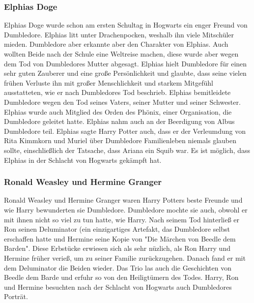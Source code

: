 \documentclass[a4paper, 10pt]{article}
\begin{document}
\subsubsection*{\large Elphias Doge}
Elphias Doge wurde schon am ersten Schultag in Hogwarts ein enger Freund von Dumbledore. Elphias litt unter Drachenpocken, weshalb ihn viele Mitschüler mieden. Dumbledore aber erkannte aber den Charakter von Elphias. Auch wollten Beide nach der Schule eine Weltreise machen, diese wurde aber wegen dem Tod von Dumbledores Mutter abgesagt. Elphias hielt Dumbledore für einen sehr guten Zauberer und eine große Persönlichkeit und glaubte, dass seine vielen frühen Verluste ihn mit großer Menschlichkeit und starkem Mitgefühl ausstatteten, wie er nach Dumbledores Tod beschrieb.
\vspace{10pt}
\newline
Elphias bemitleidete Dumbledore wegen den Tod seines Vaters, seiner Mutter und seiner Schwester. Elphias wurde auch Mitglied des Orden des Phönix, einer Organisation, die Dumbledore geleitet hatte. Elphias nahm auch an der Beerdigung von Albus Dumbledore teil.
\vspace{10pt}
\newline
Elphias sagte Harry Potter auch, dass er der Verleumdung von Rita Kimmkorn und Muriel über Dumbledore Familienleben niemals glauben sollte, einschließlich der Tatsache, dass Ariana ein Squib war. Es ist möglich, dass Elphias in der Schlacht von Hogwarts gekämpft hat.
\subsubsection*{\large Ronald Weasley und Hermine Granger}
Ronald Weasley und Hermine Granger waren Harry Potters beste Freunde und wie Harry bewunderten sie Dumbledore. Dumbledore mochte sie auch, obwohl er mit ihnen nicht so viel zu tun hatte, wie Harry.
\vspace{10pt}
\newline
Nach seinem Tod hinterließ er Ron seinen Deluminator (ein einzigartiges Artefakt, das Dumbledore selbst erschaffen hatte und Hermine seine Kopie von "Die Märchen von Beedle dem Barden". Diese Erbstücke erwiesen sich als sehr nüzlich, als Ron Harry und Hermine früher verieß, um zu seiner Familie zurückzugehen. Danach fand er mit dem Deluminator die Beiden wieder. Das Trio las auch die Geschichten von Beedle dem Barde und erfuhr so von den Heiligtümern des Todes. Harry, Ron und Hermine besuchten nach der Schlacht von Hogwarts auch Dumbledores Porträt.
\end{document}
